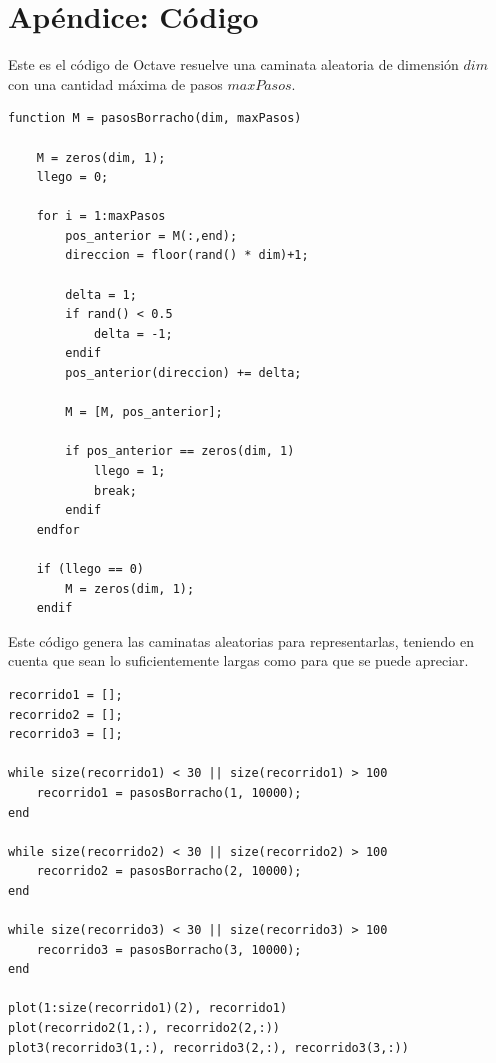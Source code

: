 \documentclass[a4paper,10pt]{article}
\begin{document}
\newpage
\section{Apéndice: Código}
Este es el c\'odigo de Octave resuelve una caminata aleatoria de dimensi\'on $dim$ con una cantidad m\'axima de pasos $maxPasos$.
\begin{lstlisting}
function M = pasosBorracho(dim, maxPasos)

	M = zeros(dim, 1);
	llego = 0;

	for i = 1:maxPasos
		pos_anterior = M(:,end);
		direccion = floor(rand() * dim)+1;

		delta = 1;
		if rand() < 0.5
			delta = -1;
		endif
		pos_anterior(direccion) += delta;

		M = [M, pos_anterior];

		if pos_anterior == zeros(dim, 1)
			llego = 1;
			break;
		endif
	endfor

	if (llego == 0)
		M = zeros(dim, 1);
	endif
\end{lstlisting}
Este c\'odigo genera las caminatas aleatorias para representarlas, teniendo en cuenta que sean lo suficientemente largas como para
que se puede apreciar. 
\begin{lstlisting}
recorrido1 = [];
recorrido2 = [];
recorrido3 = [];

while size(recorrido1) < 30 || size(recorrido1) > 100
	recorrido1 = pasosBorracho(1, 10000);
end

while size(recorrido2) < 30 || size(recorrido2) > 100
	recorrido2 = pasosBorracho(2, 10000);
end

while size(recorrido3) < 30 || size(recorrido3) > 100
	recorrido3 = pasosBorracho(3, 10000);
end

plot(1:size(recorrido1)(2), recorrido1)
plot(recorrido2(1,:), recorrido2(2,:))
plot3(recorrido3(1,:), recorrido3(2,:), recorrido3(3,:))
\end{lstlisting}
\newpage
\end{document}
